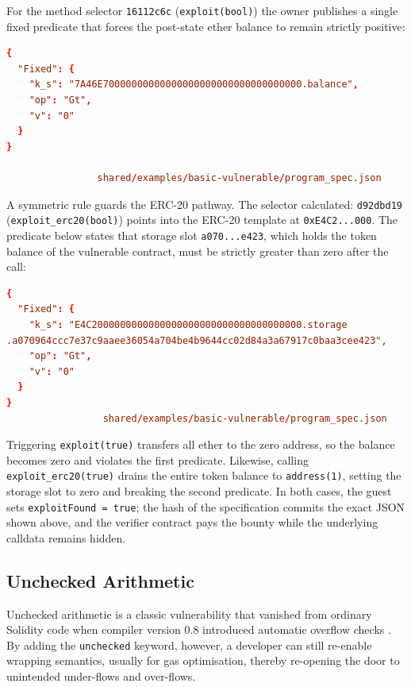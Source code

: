 For the method selector \texttt{16112c6c} (\texttt{exploit(bool)}) the owner publishes a single fixed predicate that forces the post-state ether balance to remain strictly positive:

\begin{lstlisting}[caption={[Predicate for exploit]},language=toml]
{
  "Fixed": {
    "k_s": "7A46E70000000000000000000000000000000000.balance",
    "op": "Gt",
    "v": "0"
  }
}

                shared/examples/basic-vulnerable/program_spec.json
\end{lstlisting}

A symmetric rule guards the ERC-20 pathway. The selector calculated: \texttt{d92dbd19} (\texttt{exploit\_erc20(bool)}) points into the ERC-20 template at \texttt{0xE4C2...000}.  The predicate below states that storage slot \texttt{a070...e423}, which holds the token balance of the vulnerable contract, must be strictly greater than zero after the call:

\begin{lstlisting}[caption={[Predicate for exploit\_erc20]},language=toml]
{
  "Fixed": {
    "k_s": "E4C2000000000000000000000000000000000000.storage
.a070964ccc7e37c9aaee36054a704be4b9644cc02d84a3a67917c0baa3cee423",
    "op": "Gt",
    "v": "0"
  }
}
                 shared/examples/basic-vulnerable/program_spec.json
\end{lstlisting}


Triggering \texttt{exploit(true)} transfers all ether to the zero address, so the balance becomes zero and violates the first predicate.  Likewise, calling \texttt{exploit\_erc20(true)} drains the entire token balance to \texttt{address(1)}, setting the storage slot to zero and breaking the second predicate.  In both cases, the guest sets \texttt{exploitFound = true}; the hash of the specification commits the exact JSON shown above, and the verifier contract pays the bounty while the underlying calldata remains hidden.


\subsection{Unchecked Arithmetic}

Unchecked arithmetic is a classic vulnerability that vanished from ordinary Solidity code when compiler version 0.8 introduced automatic overflow checks \cite{solidity08preview}. By adding the \texttt{unchecked} keyword, however, a developer can still re-enable wrapping semantics, usually for gas optimisation, thereby re-opening the door to unintended under-flows and over-flows.

